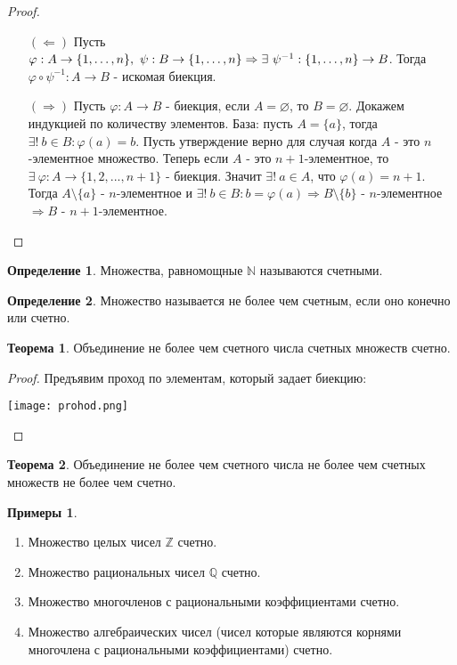 \documentclass[a4paper, 12pt]{article}
\newcommand{\Z}{\mathbb{Z}}
\newcommand{\N}{\mathbb{N}}
\newcommand{\Q}{\mathbb{Q}}
\renewcommand{\phi}{\varphi}
\renewcommand{\emptyset}{\varnothing}
\newcommand\tab[1][.5cm]{\hspace*{#1}}
\theoremstyle{definition}
\newtheorem*{definition}{Определение}
\newtheorem*{theorem}{Теорема}
\newtheorem*{examples}{Примеры}
\begin{document}
        \begin{proof}\tab
            \begin{itemize}
                \item[$(\Leftarrow)$] Пусть $\phi:A\to \{1,\dots, n\}, \ \psi:B\to \{1,\dots, n\}\\
                \Rightarrow \exists \ \psi^{-1}:\{1,\dots, n\}\to B$. Тогда $\phi \circ \psi^{-1}:A\to B$ - искомая биекция.
                \item[$(\Rightarrow)$] Пусть $\phi:A\to B$ - биекция, если $A=\emptyset$, то $B=\emptyset$. Докажем индукцией по количеству элементов. База: пусть $A=\{a\}$, тогда $\exists ! \ b\in B: \phi(a)=b$. Пусть утверждение верно для случая когда $A$ - это $n$-элементное множество. Теперь если $A$ - это $n+1$-элементное, то $\exists \ \phi:A\to \{1,2,...,n+1\}$ - биекция. Значит $\exists ! \ a\in A$, что $\phi(a)=n+1$. Тогда $A\setminus\{a\}$ - $n$-элементное и $\exists ! \ b\in B: b=\phi(a) \Rightarrow B\setminus\{b\}$ - $n$-элементное $\Rightarrow  B$ - $n+1$-элементное.
            \end{itemize}
        \end{proof}
        \begin{definition}
            Множества, равномощные $\N$ называются счетными.
        \end{definition} 
        \begin{definition}
            Множество называется не более чем счетным, если оно конечно или счетно.
        \end{definition}
        \begin{theorem}
            Объединение не более чем счетного числа счетных множеств счетно.
        \end{theorem}
        \begin{proof}
            Предъявим проход по элементам, который задает биекцию:
            \begin{center}
                \texttt{[image: prohod.png]}
            \end{center}
        \end{proof}
        \begin{theorem}
            Объединение не более чем счетного числа не более чем счетных множеств не более чем счетно.
        \end{theorem} 
        \begin{examples}\tab
            \begin{enumerate}
                \item Множество целых чисел $\Z$ счетно.
                \item Множество рациональных чисел $\Q$ счетно.
                \item Множество многочленов с рациональными коэффициентами счетно.
                \item Множество алгебраических чисел (чисел которые являются корнями многочлена с рациональными коэффициентами) счетно.
            \end{enumerate}
        \end{examples}
\end{document}
